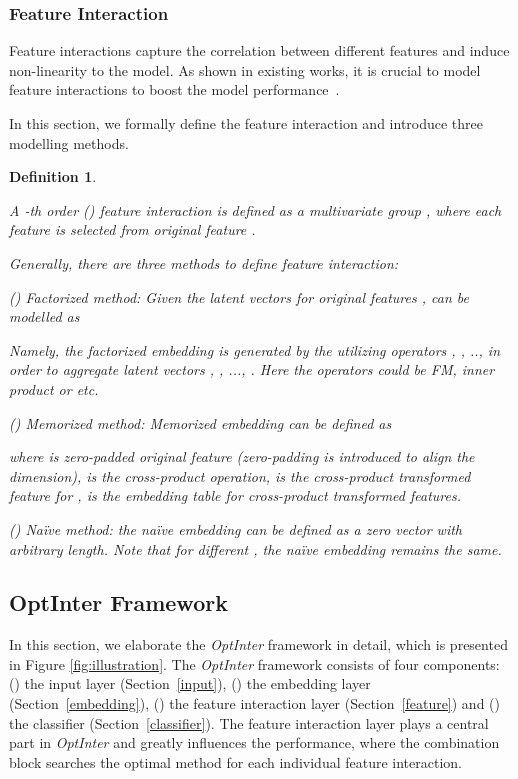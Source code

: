\documentclass[conference]{IEEEtran}
\newtheorem{myDef}{Definition}
\begin{document}
\subsubsection{Feature Interaction}
\label{sec:feature_interaction}
Feature interactions capture the correlation between different features and induce non-linearity to the model. As shown in existing works, it is crucial to model feature interactions to boost the model performance~\cite{PNN16,PNN19,DeepFM,Wide_Deep,FNN}. 

In this section, we formally define the feature interaction and introduce three modelling methods.


\begin{myDef}
\label{featuredef}

A -th order () feature interaction  is defined as a multivariate group , where each feature  is selected from original feature . 

Generally, there are three methods to define feature interaction: 

() \emph{Factorized} method: Given the latent vectors for original features ,  can be modelled as\cite{AutoPI}

Namely, the factorized embedding  is generated by the utilizing  operators , , ..,  in order to aggregate  latent vectors , , ..., . Here the operators could be FM, inner product or etc.


() \emph{Memorized} method: Memorized embedding  can be defined as\cite{FIVES} 

where  is zero-padded original feature  (zero-padding is introduced to align the dimension),  is the cross-product operation,  is the cross-product transformed feature for ,  is the embedding table for cross-product transformed features.

() \emph{Naïve} method: the naïve embedding  can be defined as a zero vector with arbitrary length. Note that for different , the naïve embedding  remains the same.

\end{myDef}



\subsection{OptInter Framework}
\label{sec:model}

In this section, we elaborate the \textit{OptInter} framework in detail, which is presented in Figure \ref{fig:illustration}. The \textit{OptInter} framework consists of four components: () the input layer (Section~\ref{input}), () the embedding layer (Section~\ref{embedding}), () the feature interaction layer (Section~\ref{feature}) and () the classifier (Section~\ref{classifier}). The feature interaction layer plays a central part in \textit{OptInter} and greatly influences the performance, where the combination block searches the optimal method for each individual feature interaction.
\end{document}
